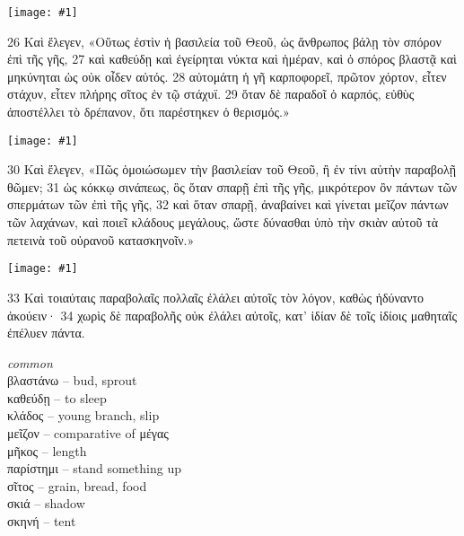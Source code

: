 \documentclass[10pt,a5paper,twoside,twocolumn]{book}
\newcommand{\fig}[1]{\texttt{[image: \#1]}\label{fig:#1}}
\newcommand*\cleartoleftpage{%
  \ifodd\value{page}\hbox{}\clearpage\fi
}
\newcommand{\sceneseparator}{%
  \vspace{-0.7\baselineskip}%
  \hspace{-0.01\textwidth}\noindent\makebox[\linewidth]{\resizebox{0.15\linewidth}{1pt}{$\bullet$}}%
  \vspace{-0.2\baselineskip}
}
\newenvironment{facing}{\cleartoleftpage}{\clearpage\pagebreak}
\newenvironment{help}{\clearpage}{}
\newenvironment{helpsec}{\begin{minipage}[t]{\textwidth}\begin{multicols}{2}}{\end{multicols}\end{minipage}}
\newenvironment{vocab}{\begin{helpsec}}{\end{helpsec}}
\begin{document}

\begin{facing}

\fig{04-26} %

26 Καὶ ἔλεγεν, «Οὕτως ἐστὶν ἡ βασιλεία τοῦ Θεοῦ, ὡς ἄνθρωπος βάλῃ τὸν σπόρον ἐπὶ τῆς γῆς, 27 καὶ καθεύδῃ καὶ ἐγείρηται νύκτα καὶ ἡμέραν, καὶ ὁ σπόρος βλαστᾷ καὶ μηκύνηται ὡς οὐκ οἶδεν αὐτός. 28 αὐτομάτη ἡ γῆ καρποφορεῖ, πρῶτον χόρτον, εἶτεν στάχυν, εἶτεν πλήρης σῖτος ἐν τῷ στάχυϊ. 29 ὅταν δὲ παραδοῖ ὁ καρπός, εὐθὺς ἀποστέλλει τὸ δρέπανον, ὅτι παρέστηκεν ὁ θερισμός.»

\fig{04-28} %

30 Καὶ ἔλεγεν, «Πῶς ὁμοιώσωμεν τὴν βασιλείαν τοῦ Θεοῦ, ἢ ἐν τίνι αὐτὴν παραβολῇ θῶμεν; 31 ὡς κόκκῳ σινάπεως, ὃς ὅταν σπαρῇ ἐπὶ τῆς γῆς, μικρότερον ὂν πάντων τῶν σπερμάτων τῶν ἐπὶ τῆς γῆς, 32 καὶ ὅταν σπαρῇ, ἀναβαίνει καὶ γίνεται μεῖζον πάντων τῶν λαχάνων, καὶ ποιεῖ κλάδους μεγάλους, ὥστε δύνασθαι ὑπὸ τὴν σκιὰν αὐτοῦ τὰ πετεινὰ τοῦ οὐρανοῦ κατασκηνοῖν.»

\vfill

\fig{04-30} %

\vfill

\sceneseparator

\vfill

33 Καὶ τοιαύταις παραβολαῖς πολλαῖς ἐλάλει αὐτοῖς τὸν λόγον, καθὼς ἠδύναντο ἀκούειν· 34 χωρὶς δὲ παραβολῆς οὐκ ἐλάλει αὐτοῖς, κατ’ ἰδίαν δὲ τοῖς ἰδίοις μαθηταῖς ἐπέλυεν πάντα.


\begin{help}
\begin{vocab}
\emph{common}\\
βλαστάνω -- bud, sprout\\
καθεύδῃ -- to sleep\\
κλάδος -- young branch, slip\\
μεῖζον -- comparative of μέγας\\
μῆκος -- length\\
παρίστημι -- stand something up\\
σῖτος -- grain, bread, food\\
σκιά -- shadow\\
σκηνή -- tent\\


\end{vocab}
\end{help}
\end{facing}
\end{document}

